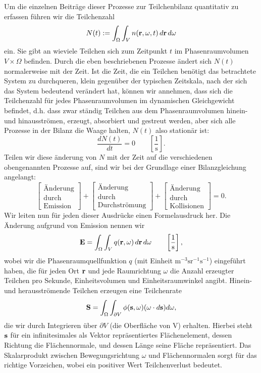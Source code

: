 	Um die einzelnen Beiträge dieser Prozesse zur Teilchenbilanz quantitativ zu erfassen führen wir die Teilchenzahl $$N(t):=\int_\Omega \int_V n(\mathbf{r},\omega,t)\,d\mathbf{r}\,d\omega$$ ein. Sie gibt an wieviele Teilchen sich zum Zeitpunkt $t$ im Phasenraumvolumen $V \times \Omega$ befinden. Durch die eben beschriebenen Prozesse ändert sich $N(t)$ normalerweise mit der Zeit. Ist die Zeit, die ein Teilchen benötigt das betrachtete System zu durchqueren, klein gegenüber der typischen Zeitskala, nach der sich das System bedeutend verändert hat, können wir annehmen, dass sich die Teilchenzahl für jedes Phasenraumvolumen im dynamischen Gleichgewicht befindet, d.h. dass zwar ständig Teilchen aus dem Phasenraumvolumen hinein- und hinausströmen, erzeugt, absorbiert und gestreut werden, aber sich alle Prozesse in der Bilanz die Waage halten, $N(t)$ also stationär ist:$$\frac{dN(t)}{dt}=0\qquad\left[\frac{1}{\text{s}}\right].$$ Teilen wir diese änderung von $N$ mit der Zeit auf die verschiedenen obengenannten Prozesse auf, sind wir bei der Grundlage einer Bilanzgleichung angelangt:$$\begin{bmatrix}\text{Änderung}\\ \text{durch}\\ \text{Emission}\end{bmatrix}+\begin{bmatrix}\text{Änderung}\\ \text{durch}\\ \text{Durchströmung}\end{bmatrix}+\begin{bmatrix}\text{Änderung}\\ \text{durch}\\ \text{Kollisionen}\end{bmatrix}=0.$$ Wir leiten nun für jeden dieser Ausdrücke einen Formelausdruck her.
	Die Änderung aufgrund von Emission nennen wir $$\mathbf{E}=\int_\Omega \int_V q(\mathbf{r},\omega)\,d\mathbf{r}\,d\omega\qquad\left[\frac{1}{\text{s}}\right],$$ wobei wir die Phasenraumquellfunktion $q$ (mit Einheit $\text{m}^{-3}\text{sr}^{-1}\text{s}^{-1}$) eingeführt haben, die für jeden Ort $\mathbf{r}$ und jede Raumrichtung $\omega$ die Anzahl erzeugter Teilchen pro Sekunde, Einheitsvolumen und Einheitsraumwinkel angibt. Hinein- und herausströmende Teilchen erzeugen eine Teilchenrate
	$$\mathbf{S}=\int_\Omega \int_{\partial V} \phi(\mathbf{s},\omega)(\omega \cdot d\mathbf{s})d\omega,$$
	die wir durch Integrieren über $\partial V$ (die Oberfläche von V) erhalten. Hierbei steht $\mathbf{s}$ für ein infinitesimales als Vektor repräsentiertes Flächenelement, dessen Richtung die Flächennormale, und dessen Länge seine Fläche repräsentiert. Das Skalarprodukt zwischen Bewegungsrichtung $\omega$ und Flächennormalen sorgt für das richtige Vorzeichen, wobei ein positiver Wert Teilchenverlust bedeutet.
